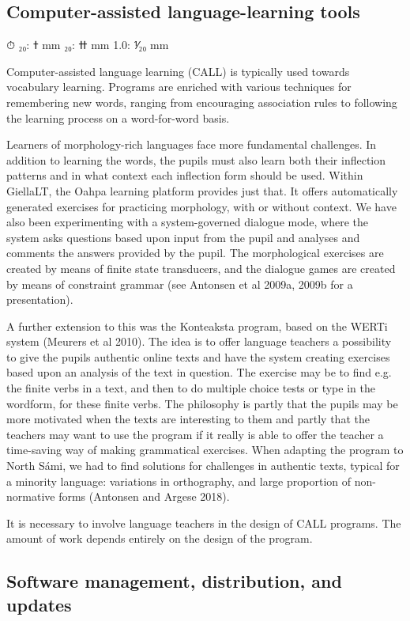 \documentclass[free]{flammie}
\begin{document}
\subsection{Computer-assisted language-learning tools}

⏱
ߙ :₂₀ mm
ߚ :₂₀ mm
1.0: ⅟₂₀ mm

Computer-assisted language learning (CALL) is typically used towards vocabulary learning. Programs are enriched with various techniques for remembering new words, ranging
from encouraging association rules to following the learning process on a word-for-word
basis.

Learners of morphology-rich languages face more fundamental challenges. In addition
to learning the words, the pupils must also learn both their inflection patterns and in what
context each inflection form should be used. Within GiellaLT, the Oahpa learning platform
provides just that. It offers automatically generated exercises for practicing morphology,
with or without context. We have also been experimenting with a system-governed dialogue mode, where the system asks questions based upon input from the pupil and analyses
and comments the answers provided by the pupil. The morphological exercises are created
by means of finite state transducers, and the dialogue games are created by means of constraint grammar (see Antonsen et al 2009a, 2009b for a presentation).

A further extension to this was the Konteaksta program, based on the WERTi system
(Meurers et al 2010). The idea is to offer language teachers a possibility to give the pupils
authentic online texts and have the system creating exercises based upon an analysis of the
text in question. The exercise may be to find e.g. the finite verbs in a text, and then to do
multiple choice tests or type in the wordform, for these finite verbs. The philosophy is
partly that the pupils may be more motivated when the texts are interesting to them and
partly that the teachers may want to use the program if it really is able to offer the teacher
a time-saving way of making grammatical exercises. When adapting the program to North
Sámi, we had to find solutions for challenges in authentic texts, typical for a minority
language: variations in orthography, and large proportion of non-normative forms
(Antonsen and Argese 2018).

It is necessary to involve language teachers in the design of CALL programs. The
amount of work depends entirely on the design of the program.

\subsection{Software management, distribution, and updates}
\end{document}

